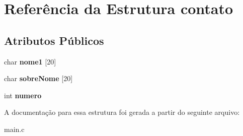 \hypertarget{structcontato}{}\section{Referência da Estrutura contato}
\label{structcontato}
\subsection*{Atributos Públicos}
\begin{DoxyCompactItemize}
\item 
\mbox{\label{structcontato_a5ec657760268360819aca548b41a1c43}} 
char {\bfseries nome1} \mbox{[}20\mbox{]}
\item 
\mbox{\label{structcontato_a95e0b580024725d8e9ff46e046c0b157}} 
char {\bfseries sobre\+Nome} \mbox{[}20\mbox{]}
\item 
\mbox{\label{structcontato_a8927cf3f4ded0b2386f1ae42e44387ad}} 
int {\bfseries numero}
\end{DoxyCompactItemize}


A documentação para essa estrutura foi gerada a partir do seguinte arquivo\+:\begin{DoxyCompactItemize}
\item 
main.\+c\end{DoxyCompactItemize}

